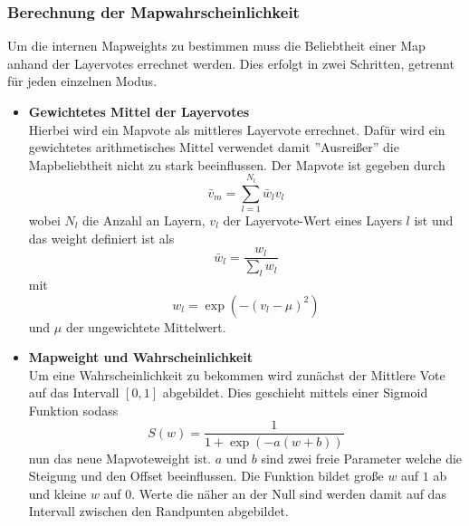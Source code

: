         \subsubsection{Berechnung der Mapwahrscheinlichkeit}
            Um die internen Mapweights zu bestimmen muss die Beliebtheit einer Map anhand der Layervotes errechnet werden. 
            Dies erfolgt in zwei Schritten, getrennt für jeden einzelnen Modus. 
            \begin{itemize}
                \item \textbf{Gewichtetes Mittel der Layervotes}\\
                Hierbei wird ein Mapvote als mittleres Layervote errechnet. 
                Dafür wird ein gewichtetes arithmetisches Mittel verwendet damit ''Ausreißer'' die Mapbeliebtheit nicht zu stark beeinflussen. 
                Der Mapvote ist gegeben durch 
                \begin{equation}
                    \bar{v}_m = \sum_{l=1}^{N_l} \bar{w}_l v_l
                \end{equation}
                wobei $N_l$ die Anzahl an Layern, $v_l$ der Layervote-Wert eines Layers $l$ ist und das weight definiert ist als 
                \begin{equation}
                    \bar{w}_l = \frac{w_l}{\sum_l w_l}
                \end{equation}
                mit 
                \begin{equation}
                    w_l = \exp\left(-\left(v_l-\mu\right)^2\right)
                \end{equation}
                und $\mu$ der ungewichtete Mittelwert. 
                \item \textbf{Mapweight und Wahrscheinlichkeit}\\
                Um eine Wahrscheinlichkeit zu bekommen wird zunächst der Mittlere Vote auf das Intervall $[0,1]$ abgebildet.
                Dies geschieht mittels einer Sigmoid Funktion sodass 
                \begin{equation}
                    S(w) = \frac{1}{1+\exp\left(-a(w+b)\right)}
                \end{equation}
                nun das neue Mapvoteweight ist. $a$ und $b$ sind zwei freie Parameter welche die Steigung und den Offset beeinflussen. 
                Die Funktion bildet große $w$ auf $1$ ab und kleine $w$ auf $0$. 
                Werte die näher an der Null sind werden damit auf das Intervall zwischen den Randpunten abgebildet.

\end{itemize}
